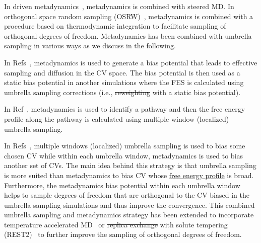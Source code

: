 \documentclass[9pt,review]{livecoms}
\providecommand{\DIFaddtex}[1]{{\protect\color{blue}\uwave{#1}}} %
\providecommand{\DIFdeltex}[1]{{\protect\color{red}\sout{#1}}}                      %
\providecommand{\DIFaddbegin}{} %
\providecommand{\DIFaddend}{} %
\providecommand{\DIFdelbegin}{} %
\providecommand{\DIFdelend}{} %
\providecommand{\DIFadd}[1]{\texorpdfstring{\DIFaddtex{#1}}{#1}} %
\providecommand{\DIFdel}[1]{\texorpdfstring{\DIFdeltex{#1}}{}} %
\newcommand{\DIFscaledelfig}{0.5}
\newlength{\DIFdelgraphicswidth} %
\newlength{\DIFdelgraphicsheight} %
\newcommand{\DIFaddincludegraphics}[2][]{{\color{blue}\fbox{\DIFOincludegraphics[#1]{#2}}}} %
\newcommand{\DIFdelincludegraphics}[2][]{%
\sbox{\DIFdelgraphicsbox}{\DIFOincludegraphics[#1]{#2}}%
\settoboxwidth{\DIFdelgraphicswidth}{\DIFdelgraphicsbox} %
\settoboxtotalheight{\DIFdelgraphicsheight}{\DIFdelgraphicsbox} %
\scalebox{\DIFscaledelfig}{%
\parbox[b]{\DIFdelgraphicswidth}{\usebox{\DIFdelgraphicsbox}\\[-\baselineskip] \rule{\DIFdelgraphicswidth}{0em}}\llap{\resizebox{\DIFdelgraphicswidth}{\DIFdelgraphicsheight}{%
\setlength{\unitlength}{\DIFdelgraphicswidth}%
\begin{picture}(1,1)%
\thicklines\linethickness{2pt} %
{\color[rgb]{1,0,0}\put(0,0){\framebox(1,1){}}}%
{\color[rgb]{1,0,0}\put(0,0){\line( 1,1){1}}}%
{\color[rgb]{1,0,0}\put(0,1){\line(1,-1){1}}}%
\end{picture}%
}\hspace*{3pt}}} %
} %
\DeclareRobustCommand{\DIFaddbegin}{\DIFOaddbegin \let\includegraphics\DIFaddincludegraphics} %
\DeclareRobustCommand{\DIFaddend}{\DIFOaddend \let\includegraphics\DIFOincludegraphics} %
\DeclareRobustCommand{\DIFdelbegin}{\DIFOdelbegin \let\includegraphics\DIFdelincludegraphics} %
\DeclareRobustCommand{\DIFdelend}{\DIFOaddend \let\includegraphics\DIFOincludegraphics} %
\begin{document}
In driven metadynamics~\cite{Moradi_DrivenMetaD_JPCL2013}, metadynamics is combined with steered MD.
In orthogonal space random sampling (OSRW)~\cite{Zheng_OSRW-1_PNAS2008,Zheng_OSRW-2_JCP2009,Min_OSRW-3_JCTC2010}, metadynamics is combined with a procedure based on thermodynamic integration to facilitate sampling of orthogonal degrees of freedom. Metadynamics has been combined with umbrella sampling in various ways as we discuss in the following.

In Refs~\cite{Badin_MetaD-US-1_JCP2006,Autieri_MetaD-US-2_JCP2010}, metadynamics is used to generate a bias potential that leads to effective sampling and diffusion in the CV space. The bias potential is then used as a static bias potential in another simulations where the FES is calculated using umbrella sampling corrections (i.e., \DIFdelbegin \DIFdel{reweighting }\DIFdelend \DIFaddbegin \hyperlink{ref:Reweighting} {\DIFadd{reweighting}} \DIFaddend with a static bias potential).

In Ref~\cite{Zhang_MetaD-US-3_JCTC2013}, metadynamics is used to identify a pathway and then the free energy profile along the pathway is calculated using multiple window (localized) umbrella sampling.

In Refs~\cite{Johnston_MetaD-US-4_PLos2012,Awasthi_MetaD-US-5_JCC2016}, multiple windows (localized) umbrella sampling is used to bias some chosen CV while within each umbrella window, metadynamics is used to bias another set of CVs. The main idea behind this strategy is that umbrella sampling is more suited than metadynamics to bias CV whose \DIFaddbegin \hyperlink{ref:FES} {\DIFaddend free energy profile\DIFaddbegin } \DIFaddend is broad. Furthermore, the metadynamics bias potential within each umbrella window helps to sample degrees of freedom that are orthogonal to the CV biased in the umbrella sampling simulations and thus improve the convergence. This combined umbrella sampling and metadynamics strategy has been extended to incorporate temperature accelerated MD~\cite{Awasthi_TASS_JCP2017,Pal_TASS-2_JCC2021} or \DIFdelbegin \DIFdel{replica exchange }\DIFdelend \DIFaddbegin \hyperlink{ref:ReplEx} {\DIFadd{replica exchange}} \DIFaddend with solute tempering (REST2)~\cite{Kapakayala_WS-MetaD+REST2_JCC2021} to further improve the sampling of orthogonal degrees of freedom.
\end{document}
